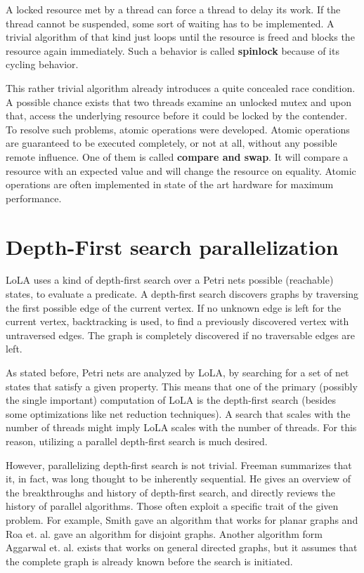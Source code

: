 A locked resource met by a thread can force a thread to delay its work. If the thread cannot be suspended, some sort of waiting has to be implemented. A trivial algorithm of that kind just loops until the resource is freed and blocks the resource again immediately. Such a behavior is called \textbf{spinlock} because of its cycling behavior.

This rather trivial algorithm already introduces a quite concealed race condition. A possible chance exists that two threads examine an unlocked mutex and upon that, access the underlying resource before it could be locked by the contender. To resolve such problems, atomic operations were developed. Atomic operations are guaranteed to be executed completely, or not at all, without any possible remote influence. One of them is called \textbf{compare and swap}. It will compare a resource with an expected value and will change the resource on equality. Atomic operations are often implemented in state of the art hardware for maximum performance.

\section{Depth-First search parallelization}
LoLA uses a kind of depth-first search over a Petri nets possible (reachable) states, to evaluate a predicate. A depth-first search discovers graphs\cite[chapter~1]{bondy1976graph} by traversing the first possible edge of the current vertex. If no unknown edge is left for the current vertex, backtracking\cite{golomb1965backtrack} is used, to find a previously discovered vertex with untraversed edges. The graph is completely discovered if no traversable edges are left.

As stated before, Petri nets are analyzed by LoLA, by searching for a set of net states that satisfy a given property. This means that one of the primary (possibly the single important) computation of LoLA is the depth-first search (besides some optimizations like net reduction techniques). A search that scales with the number of threads might imply LoLA scales with the number of threads. For this reason, utilizing a parallel depth-first search is much desired.

However, parallelizing depth-first search is not trivial. Freeman summarizes that it, in fact, was long thought to be inherently sequential\cite{freeman1991parallel}. He gives an overview of the breakthroughs and history of depth-first search, and  directly reviews the history of parallel algorithms. Those often exploit a specific trait of the given problem. For example, Smith gave an algorithm that works for planar graphs\cite{smith1986parallel} and Roa et. al. gave an algorithm for disjoint graphs\cite{rao1987parallel}. Another algorithm form Aggarwal et. al. exists that works on general directed graphs\cite{Aggarwal:1989:PDS:73007.73035}, but it assumes that the complete graph is already known before the search is initiated.

